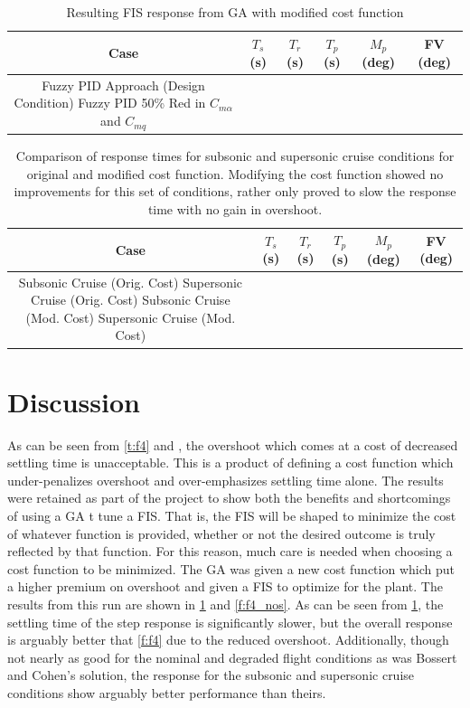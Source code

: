 \begin{table}[h] \centering \caption{Resulting FIS response from GA with modified cost
    function}\label{t:f4_nos} \begin{tabular}{|c|c|c|c|c|c|}\hline Case & $T_s$ (s) & $T_r$ (s) & $T_p$ (s) &
        $M_p$ (deg) & FV (deg) \\\hline Fuzzy PID Approach (Design Condition)
         Fuzzy PID 50\% Red in $C_{m\alpha}$ and $C_{mq}$
         \end{tabular} \end{table}

\begin{table}[h] \centering \caption{Comparison of response times for subsonic and supersonic cruise
    conditions for original and modified cost function. Modifying the cost function showed no improvements for
this set of conditions, rather only proved to slow the response time with no gain in
overshoot.}\label{t:subsup} \begin{tabular}{|c|c|c|c|c|c|}\hline Case & $T_s$ (s) & $T_r$ (s) & $T_p$ (s) &
    $M_p$ (deg) & FV (deg) \\\hline Subsonic Cruise (Orig. Cost)  Supersonic Cruise (Orig.
    Cost)  Subsonic Cruise (Mod. Cost)  Supersonic Cruise (Mod.
    Cost)  \end{tabular} \end{table}

\section{Discussion} As can be seen from \cref{t:f4} and , the
overshoot which comes at a cost of decreased settling time is unacceptable. This is a product of defining a
cost function which under-penalizes overshoot and over-emphasizes settling time alone. The results were
retained as part of the project to show both the benefits and shortcomings of using a GA t tune a FIS. That
is, the FIS will be shaped to minimize the cost of whatever function is provided, whether or not the desired
outcome is truly reflected by that function. For this reason, much care is needed when choosing a cost
function to be minimized. The GA was given a new cost function which put a higher premium on overshoot and
given a FIS to optimize for the plant. The results from this run are shown in \cref{t:f4_nos} and
\cref{f:f4_nos}. As can be seen from \cref{t:f4_nos}, the settling time of the step response is significantly
slower, but the overall response is arguably better that \cref{f:f4} due to the reduced overshoot.
Additionally, though not nearly as good for the nominal and degraded flight conditions as was Bossert and
Cohen's solution, the response for the subsonic and supersonic cruise conditions show arguably better
performance than theirs.

